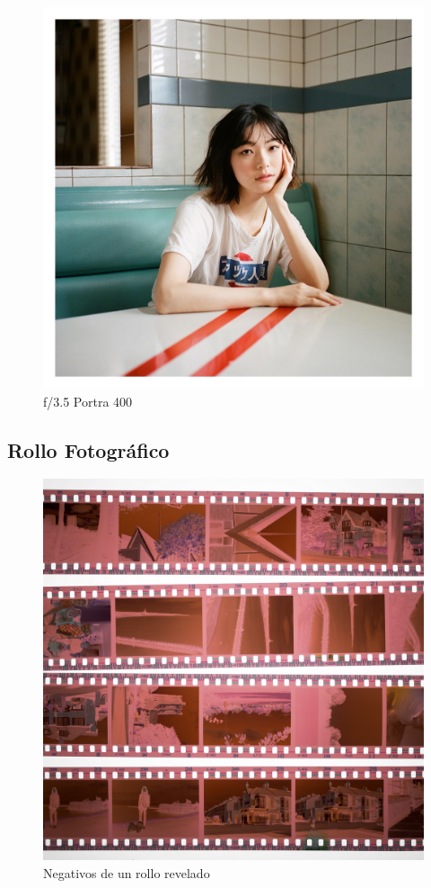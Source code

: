 \documentclass{article}
\begin{document}
\begin{figure}[H]
	\centering
	\includegraphics[width=0.85\linewidth]{Figuras/Film_Photo_3}
	\caption{f/3.5 Portra 400}
	\label{fig:filmphoto3}
\end{figure}




\subsection{Rollo Fotográfico}

\begin{figure}[H]
	\centering
	\includegraphics[width=0.65\linewidth]{Figuras/Film}
	\caption{Negativos de un rollo revelado}
	\label{fig:film}
\end{figure}
\end{document}
